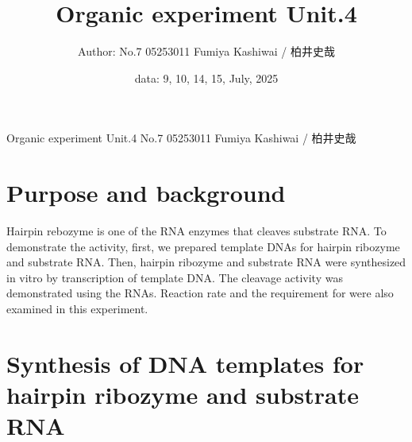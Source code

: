 \documentclass{ltjsarticle}
\theoremstyle{definition}
\numberwithin{equation}{section}
\begin{document}
\title{Organic experiment Unit.4}
\date{data: 9, 10, 14, 15, July, 2025}
\author{Author: No.7 05253011 Fumiya Kashiwai / 柏井史哉}
\maketitle
{} {Organic experiment Unit.4 No.7 05253011 Fumiya Kashiwai / 柏井史哉}

\newpage
\section{Purpose and background}
Hairpin rebozyme is one of the RNA enzymes that cleaves substrate RNA. To demonstrate the activity, first, we prepared template DNAs for hairpin ribozyme and substrate RNA. Then, hairpin ribozyme and substrate RNA were synthesized in vitro by transcription of template DNA. The cleavage activity was demonstrated using the RNAs. Reaction rate and the requirement for  were also examined in this experiment.

\section{Synthesis of DNA templates for hairpin ribozyme and substrate RNA}
\end{document}
